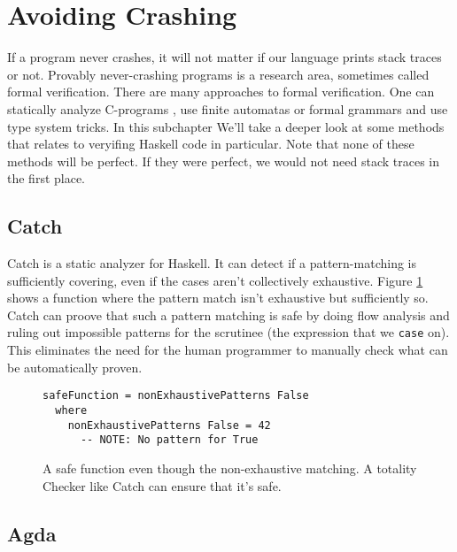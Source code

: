 
\section{Avoiding Crashing} \label{sec:avoiding_crashing}

If a program never crashes,
it will not matter if our language prints stack traces or not. Provably never-crashing programs is a research area, sometimes called formal
verification. There are many approaches to formal verification. One
can statically analyze C-programs \cite{ckl2004},   %
use finite automatas %
or formal grammars \cite{dantam2013motion} %
and use type system tricks. %
In this subchapter We'll take a deeper look at some methods that
relates to veryifing Haskell code in particular. Note that none
of these methods will be perfect. If they were perfect, we would not
need stack traces in the first place.

\subsection{Catch}

Catch is a static analyzer for Haskell. It can detect if a pattern-matching is
sufficiently covering, even if the cases aren't collectively exhaustive. Figure
\ref{fig:catch_example} shows a function where the pattern match isn't exhaustive but
sufficiently so.
Catch can proove that such a pattern
matching is safe by doing flow analysis and ruling out impossible
patterns for the scrutinee (the expression that we \texttt{case} on). %
This eliminates the need for the human programmer to manually check what can be
automatically proven. \cite{mitchell:catch_2008_9_25}

\begin{figure}
      \begin{verbatim}
safeFunction = nonExhaustivePatterns False
  where
    nonExhaustivePatterns False = 42
      -- NOTE: No pattern for True
      \end{verbatim}
      \caption{A safe function even though the non-exhaustive matching. A
        totality Checker like Catch can ensure that it's safe.}
      \label{fig:catch_example}
\end{figure}

\subsection{Agda}

